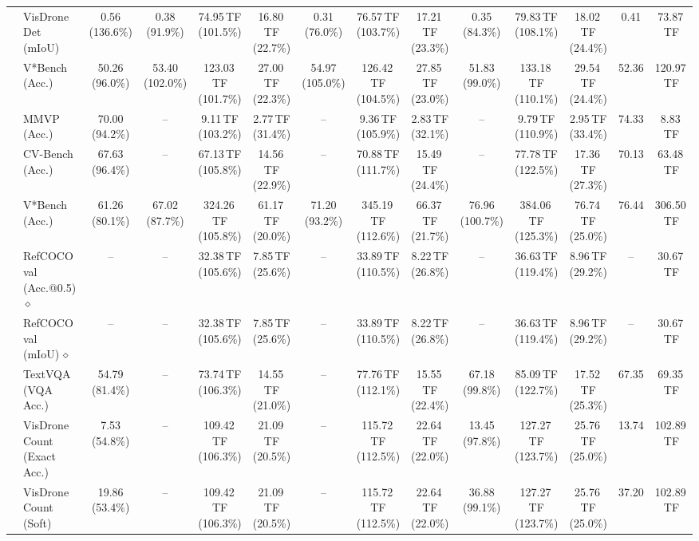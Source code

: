 \begin{table}[t]
\begin{center}
\begin{small}
\begin{sc}
{\begin{tabular}{llcccccccccccc}
& VisDrone Det (mIoU) & 0.56 (136.6\%) & 0.38 (91.9\%) & 74.95\,TF (101.5\%) & 16.80\,TF (22.7\%) & 0.31 (76.0\%) & 76.57\,TF (103.7\%) & 17.21\,TF (23.3\%) & 0.35 (84.3\%) & 79.83\,TF (108.1\%) & 18.02\,TF (24.4\%) & 0.41 & 73.87\,TF \\
& V*Bench (Acc.) & 50.26 (96.0\%) & 53.40 (102.0\%) & 123.03\,TF (101.7\%) & 27.00\,TF (22.3\%) & 54.97 (105.0\%) & 126.42\,TF (104.5\%) & 27.85\,TF (23.0\%) & 51.83 (99.0\%) & 133.18\,TF (110.1\%) & 29.54\,TF (24.4\%) & 52.36 & 120.97\,TF \\
\midrule
{}
& MMVP (Acc.) & 70.00 (94.2\%) & -- & 9.11\,TF (103.2\%) & 2.77\,TF (31.4\%) & -- & 9.36\,TF (105.9\%) & 2.83\,TF (32.1\%) & -- & 9.79\,TF (110.9\%) & 2.95\,TF (33.4\%) & 74.33 & 8.83\,TF \\
& CV-Bench (Acc.) & 67.63 (96.4\%) & -- & 67.13\,TF (105.8\%) & 14.56\,TF (22.9\%) & -- & 70.88\,TF (111.7\%) & 15.49\,TF (24.4\%) & -- & 77.78\,TF (122.5\%) & 17.36\,TF (27.3\%) & 70.13 & 63.48\,TF \\
& V*Bench (Acc.) & 61.26 (80.1\%) & 67.02 (87.7\%) & 324.26\,TF (105.8\%) & 61.17\,TF (20.0\%) & 71.20 (93.2\%) & 345.19\,TF (112.6\%) & 66.37\,TF (21.7\%) & 76.96 (100.7\%) & 384.06\,TF (125.3\%) & 76.74\,TF (25.0\%) & 76.44 & 306.50\,TF \\
& RefCOCO val (Acc.@0.5)\,$\diamond$ & -- & -- & 32.38\,TF (105.6\%) & 7.85\,TF (25.6\%) & -- & 33.89\,TF (110.5\%) & 8.22\,TF (26.8\%) & -- & 36.63\,TF (119.4\%) & 8.96\,TF (29.2\%) & -- & 30.67\,TF \\
& RefCOCO val (mIoU)\,$\diamond$ & -- & -- & 32.38\,TF (105.6\%) & 7.85\,TF (25.6\%) & -- & 33.89\,TF (110.5\%) & 8.22\,TF (26.8\%) & -- & 36.63\,TF (119.4\%) & 8.96\,TF (29.2\%) & -- & 30.67\,TF \\
& TextVQA (VQA Acc.) & 54.79 (81.4\%) & -- & 73.74\,TF (106.3\%) & 14.55\,TF (21.0\%) & -- & 77.76\,TF (112.1\%) & 15.55\,TF (22.4\%) & 67.18 (99.8\%) & 85.09\,TF (122.7\%) & 17.52\,TF (25.3\%) & 67.35 & 69.35\,TF \\
& VisDrone Count (Exact Acc.) & 7.53 (54.8\%) & -- & 109.42\,TF (106.3\%) & 21.09\,TF (20.5\%) & -- & 115.72\,TF (112.5\%) & 22.64\,TF (22.0\%) & 13.45 (97.8\%) & 127.27\,TF (123.7\%) & 25.76\,TF (25.0\%) & 13.74 & 102.89\,TF \\
& VisDrone Count (Soft) & 19.86 (53.4\%) & -- & 109.42\,TF (106.3\%) & 21.09\,TF (20.5\%) & -- & 115.72\,TF (112.5\%) & 22.64\,TF (22.0\%) & 36.88 (99.1\%) & 127.27\,TF (123.7\%) & 25.76\,TF (25.0\%) & 37.20 & 102.89\,TF \\

\end{tabular}}
\end{sc}
\end{small}
\end{center}
\end{table}
